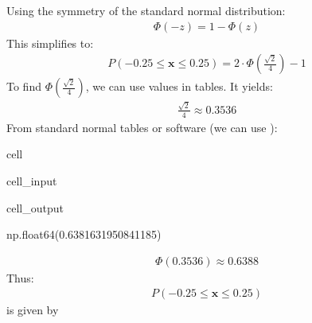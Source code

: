\documentclass[letterpaper,10pt,english]{jupyterBook}
\begin{document}
\sphinxAtStartPar
Using the symmetry of the standard normal distribution:
\begin{equation*}
\begin{split}\Phi(-z) = 1 - \Phi(z)\end{split}
\end{equation*}
\sphinxAtStartPar
This simplifies to:
\begin{equation*}
\begin{split}P(-0.25 \leq \mathbf x \leq 0.25) = 2 \cdot \Phi\left(\frac{\sqrt{2}}{4}\right) - 1\end{split}
\end{equation*}
\sphinxAtStartPar
To find \(\Phi\left(\frac{\sqrt{2}}{4}\right)\), we can use values in tables. It yields:
\begin{equation*}
\begin{split}\frac{\sqrt{2}}{4} \approx 0.3536\end{split}
\end{equation*}
\sphinxAtStartPar
From standard normal tables or software (we can use ):

\begin{sphinxuseclass}{cell}\begin{sphinxVerbatimInput}

\begin{sphinxuseclass}{cell_input}
\begin{sphinxVerbatim}[commandchars=\\\{\}]
\end{sphinxVerbatim}

\end{sphinxuseclass}\end{sphinxVerbatimInput}
\begin{sphinxVerbatimOutput}

\begin{sphinxuseclass}{cell_output}
\begin{sphinxVerbatim}[commandchars=\\\{\}]
np.float64(0.6381631950841185)
\end{sphinxVerbatim}

\end{sphinxuseclass}\end{sphinxVerbatimOutput}

\end{sphinxuseclass}\begin{equation*}
\begin{split}\Phi(0.3536) \approx 0.6388\end{split}
\end{equation*}
\sphinxAtStartPar
Thus:
\begin{equation*}
\begin{split}P(-0.25 \leq \mathbf x \leq 0.25)\end{split}
\end{equation*}
\sphinxAtStartPar
is given by
\end{document}
